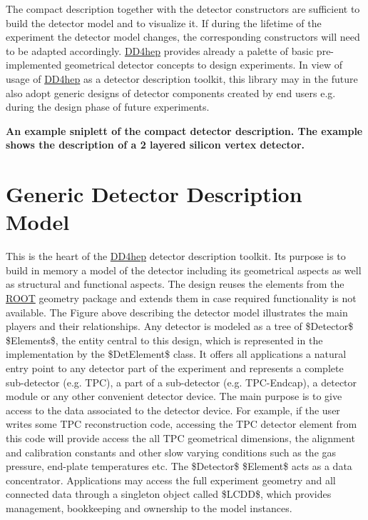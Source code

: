 The compact description together with the detector constructors are sufficient to build the detector model and to visualize it. If during the lifetime of the experiment the detector model changes, the corresponding constructors will need to be adapted accordingly. \hyperlink{namespace_d_d4hep}{DD4hep} provides already a palette of basic pre-\/implemented geometrical detector concepts to design experiments. In view of usage of \hyperlink{namespace_d_d4hep}{DD4hep} as a detector description toolkit, this library may in the future also adopt generic designs of detector components created by end users e.g. during the design phase of future experiments.



{\bfseries An example sniplett of the compact detector description. The example shows the description of a 2 layered silicon vertex detector. }\hypertarget{index_DETDESCMODEL}{}\section{Generic Detector Description Model}\label{index_DETDESCMODEL}
This is the heart of the \hyperlink{namespace_d_d4hep}{DD4hep} detector description toolkit. Its purpose is to build in memory a model of the detector including its geometrical aspects as well as structural and functional aspects. The design reuses the elements from the \hyperlink{namespace_r_o_o_t}{ROOT} geometry package and extends them in case required functionality is not available. The Figure above describing the detector model illustrates the main players and their relationships. Any detector is modeled as a tree of \$Detector\$ \$Elements\$, the entity central to this design, which is represented in the implementation by the \$DetElement\$ class. It offers all applications a natural entry point to any detector part of the experiment and represents a complete sub-\/detector (e.g. TPC), a part of a sub-\/detector (e.g. TPC-\/Endcap), a detector module or any other convenient detector device. The main purpose is to give access to the data associated to the detector device. For example, if the user writes some TPC reconstruction code, accessing the TPC detector element from this code will provide access the all TPC geometrical dimensions, the alignment and calibration constants and other slow varying conditions such as the gas pressure, end-\/plate temperatures etc. The \$Detector\$ \$Element\$ acts as a data concentrator. Applications may access the full experiment geometry and all connected data through a singleton object called \$LCDD\$, which provides management, bookkeeping and ownership to the model instances.

